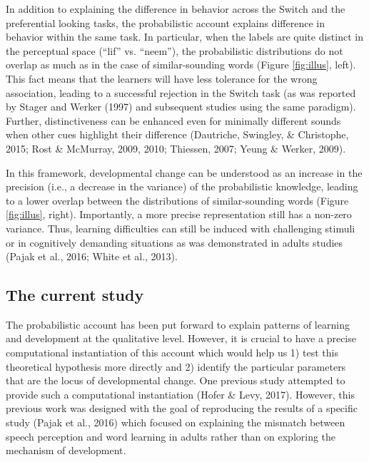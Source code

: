 \documentclass[english,,man]{apa6}
\theoremstyle{definition}
\theoremstyle{definition}
\theoremstyle{definition}
\theoremstyle{remark}
\begin{document}
In addition to explaining the difference in behavior across the Switch
and the preferential looking tasks, the probabilistic account explains
difference in behavior within the same task. In particular, when the
labels are quite distinct in the perceptual space (\enquote{lif} vs.
\enquote{neem}), the probabilistic distributions do not overlap as much
as in the case of similar-sounding words (Figure \ref{fig:illus}, left).
This fact means that the learners will have less tolerance for the wrong
association, leading to a successful rejection in the Switch task (as
was reported by Stager and Werker (1997) and subsequent studies using
the same paradigm). Further, distinctiveness can be enhanced even for
minimally different sounds when other cues highlight their difference
(Dautriche, Swingley, \& Christophe, 2015; Rost \& McMurray, 2009, 2010;
Thiessen, 2007; Yeung \& Werker, 2009).

In this framework, developmental change can be understood as an increase
in the precision (i.e., a decrease in the variance) of the probabilistic
knowledge, leading to a lower overlap between the distributions of
similar-sounding words (Figure \ref{fig:illus}, right). Importantly, a
more precise representation still has a non-zero variance. Thus,
learning difficulties can still be induced with challenging stimuli or
in cognitively demanding situations as was demonstrated in adults
studies (Pajak et al., 2016; White et al., 2013).

\subsection{The current study}\label{the-current-study}

The probabilistic account has been put forward to explain patterns of
learning and development at the qualitative level. However, it is
crucial to have a precise computational instantiation of this account
which would help us 1) test this theoretical hypothesis more directly
and 2) identify the particular parameters that are the locus of
developmental change. One previous study attempted to provide such a
computational instantiation (Hofer \& Levy, 2017). However, this
previous work was designed with the goal of reproducing the results of a
specific study (Pajak et al., 2016) which focused on explaining the
mismatch between speech perception and word learning in adults rather
than on exploring the mechanism of development.
\end{document}
